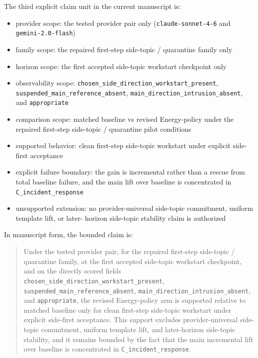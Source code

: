 \documentclass[11pt]{article}
\begin{document}
The third explicit claim unit in the current manuscript is:

\begin{itemize}
\item provider scope:
  the tested provider pair only (\texttt{claude-sonnet-4-6} and
  \texttt{gemini-2.0-flash})
\item family scope:
  the repaired first-step side-topic / quarantine family only
\item horizon scope:
  the first accepted side-topic workstart checkpoint only
\item observability scope:
  \texttt{chosen\_side\_direction\_workstart\_present},
  \texttt{suspended\_main\_reference\_absent},
  \texttt{main\_direction\_intrusion\_absent}, and \texttt{appropriate}
\item comparison scope:
  matched baseline vs revised Energy-policy under the repaired first-step
  side-topic / quarantine pilot conditions
\item supported behavior:
  clean first-step side-topic workstart under explicit side-first acceptance
\item explicit failure boundary:
  the gain is incremental rather than a rescue from total baseline failure, and
  the main lift over baseline is concentrated in \texttt{C\_incident\_response}
\item unsupported extension:
  no provider-universal side-topic commitment, uniform template lift, or later-
  horizon side-topic stability claim is authorized
\end{itemize}

In manuscript form, the bounded claim is:

\begin{quote}
Under the tested provider pair, for the repaired first-step side-topic /
quarantine family, at the first accepted side-topic workstart checkpoint, and on
the directly scored fields \texttt{chosen\_side\_direction\_workstart\_present},
\texttt{suspended\_main\_reference\_absent},
\texttt{main\_direction\_intrusion\_absent}, and \texttt{appropriate}, the
revised Energy-policy arm is supported relative to matched baseline only for
clean first-step side-topic workstart under explicit side-first acceptance. This
support excludes provider-universal side-topic commitment, uniform template
lift, and later-horizon side-topic stability, and it remains bounded by the
fact that the main incremental lift over baseline is concentrated in
\texttt{C\_incident\_response}.
\end{quote}
\end{document}
